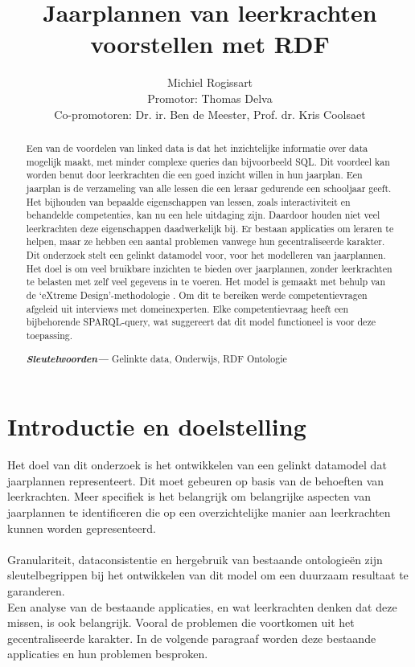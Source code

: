 \documentclass[12pt,journal]{IEEEtran}
\providecommand{\keywords}[1]
{
  \small	
  \textbf{\textit{Sleutelwoorden---}} #1
}
\begin{document}
\pagestyle{empty}
\title{Jaarplannen van leerkrachten voorstellen met RDF}
\author{Michiel Rogissart\\[12pt]
	\large Promotor: Thomas Delva \\
	Co-promotoren: Dr. ir. Ben de Meester, Prof. dr. Kris Coolsaet}
\maketitle


\setcounter{page}{7}
\thispagestyle{plain}
\pagestyle{plain}
\begin{abstract}
	Een van de voordelen van linked data is dat het inzichtelijke informatie over data mogelijk maakt, met minder complexe queries dan bijvoorbeeld SQL\cite{sqlvsqparql}.
	Dit voordeel kan worden benut door leerkrachten die een goed inzicht willen in hun jaarplan. Een jaarplan is de verzameling van alle lessen die een leraar gedurende een schooljaar geeft.
	Het bijhouden van bepaalde eigenschappen van lessen, zoals interactiviteit en behandelde competenties, kan nu een hele uitdaging zijn.
	Daardoor houden niet veel leerkrachten deze eigenschappen daadwerkelijk bij.
	Er bestaan applicaties om leraren te helpen, maar ze hebben een aantal problemen vanwege hun gecentraliseerde karakter.\\
	Dit onderzoek stelt een gelinkt datamodel voor, voor het modelleren van jaarplannen. Het doel is om veel bruikbare inzichten te bieden over jaarplannen, zonder leerkrachten te belasten met zelf veel gegevens in te voeren.
	Het model is gemaakt met behulp van de `eXtreme Design'-methodologie \cite{xd}.
	Om dit te bereiken werde competentievragen afgeleid uit interviews met domeinexperten.
	Elke competentievraag heeft een bijbehorende SPARQL-query, wat suggereert dat dit model functioneel is voor deze toepassing.
	\keywords{Gelinkte data, Onderwijs, RDF Ontologie}
\end{abstract}

\section{Introductie en doelstelling}
\noindent Het doel van dit onderzoek is het ontwikkelen van een gelinkt datamodel dat jaarplannen representeert. Dit moet gebeuren op basis van de behoeften van leerkrachten.
	Meer specifiek is het belangrijk om belangrijke aspecten van jaarplannen te identificeren die op een overzichtelijke manier aan leerkrachten kunnen worden gepresenteerd. \\ \\
	Granulariteit, dataconsistentie en hergebruik van bestaande ontologieën zijn sleutelbegrippen bij het ontwikkelen van dit model om een duurzaam resultaat te garanderen.\\
	Een analyse van de bestaande applicaties, en wat leerkrachten denken dat deze missen, is ook belangrijk. Vooral de problemen die voortkomen uit het gecentraliseerde karakter.
	In de volgende paragraaf worden deze bestaande applicaties en hun problemen besproken.
\end{document}
